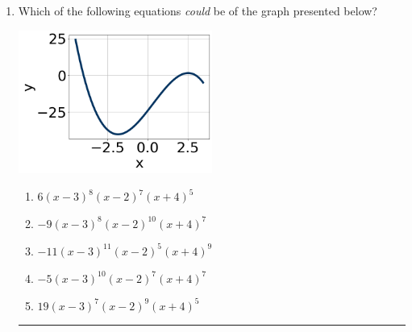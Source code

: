 \documentclass[14pt]{extbook}
\newcommand{\litem}[1]{\item#1\hspace*{-1cm}\rule{\textwidth}{0.4pt}}
\begin{document}
\begin{enumerate}
{\begin{enumerate}[label=\Alph*.]
\end{enumerate} }
\litem{
Which of the following equations \textit{could} be of the graph presented below?
\begin{center}
    \includegraphics[width=0.5\textwidth]{../Figures/polyGraphToFunctionCopyB.png}
\end{center}
\begin{enumerate}[label=\Alph*.]
\item \( 6(x - 3)^{8} (x - 2)^{7} (x + 4)^{5} \)
\item \( -9(x - 3)^{8} (x - 2)^{10} (x + 4)^{7} \)
\item \( -11(x - 3)^{11} (x - 2)^{5} (x + 4)^{9} \)
\item \( -5(x - 3)^{10} (x - 2)^{7} (x + 4)^{7} \)
\item \( 19(x - 3)^{7} (x - 2)^{9} (x + 4)^{5} \)


\end{enumerate}}
\end{enumerate}
\end{document}
